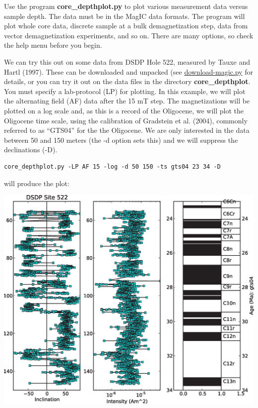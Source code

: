 \documentclass[11pt]{book}
\begin{document}
{{{{{Use the program {\bf core\_depthplot.py} to plot various measurement data versus sample depth.   The data must be in the MagIC data formats.  The program will plot whole core data, discrete sample at a bulk demagnetization step, data from vector demagnetization experiments, and so on.  There are many options, so check the help menu before you begin.     

We can try this out on some data from DSDP Hole 522, measured by Tauxe and Hartl (1997).  \nocite{tauxe97}  These can be downloaded and unpacked (see \href{#download_magic.py}{download-magic.py} for details,  or you can try it out on the data files in the directory {\bf core\_depthplot}.   You must specify a lab-protocol (LP) for plotting.  In this example, we will plot the alternating field (AF) data after the 15 mT step.  The magnetizations will be plotted on a log scale and, as this is a record of the Oligocene, we will plot the Oligocene time scale, using the calibration of Gradstein et al. (2004),  \nocite{gradstein04} commonly referred to as ``GTS04'' for the the Oligocene.  We are only interested in the data between 50 and 150 meters (the -d option sets this) and we will suppress the declinations (-D).  

\begin{verbatim}
core_depthplot.py -LP AF 15 -log -d 50 150 -ts gts04 23 34 -D
\end{verbatim}

\noindent  will produce the plot:

\includegraphics[width=15 cm]{EPSfiles/core-depthplot.eps}


}}}}}
\end{document}
